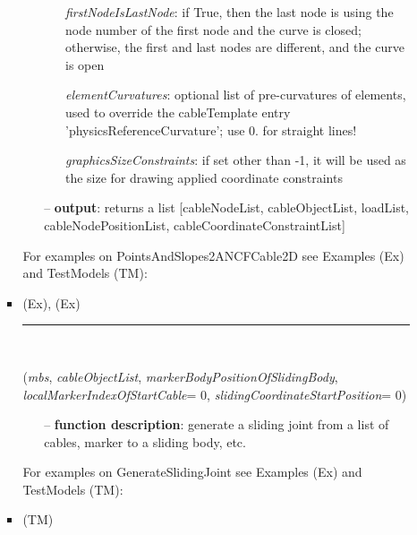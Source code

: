 \begin{itemize}[leftmargin=1.4cm]
\begin{itemize}[leftmargin=0.5cm]
\begin{itemize}[leftmargin=1.4cm]
\begin{itemize}[leftmargin=0.7cm]
\begin{itemize}[leftmargin=1.2cm]
    \item[] {\it   firstNodeIsLastNode}: if True, then the last node is using the node number of the first node and the curve is closed; otherwise, the first and last nodes are different, and the curve is open
    \item[] {\it   elementCurvatures}: optional list of pre-curvatures of elements, used to override the cableTemplate entry 'physicsReferenceCurvature'; use 0. for straight lines!
    \item[] {\it   graphicsSizeConstraints}: if set other than -1, it will be used as the size for drawing applied coordinate constraints
  \end{itemize}
  \item[--]  {\bf output}: returns a list [cableNodeList, cableObjectList, loadList, cableNodePositionList, cableCoordinateConstraintList]\vspace{12pt}\end{itemize}
%
%
\noindent For examples on PointsAndSlopes2ANCFCable2D see Examples (Ex) and TestModels (TM):
\bi
 \item \footnotesize {} (Ex), 
 (Ex)\ei

%
\noindent\rule{8cm}{0.75pt}\vspace{1pt} \\ 
\begin{flushleft}
\label{sec:beams:GenerateSlidingJoint}
({\it mbs}, {\it cableObjectList}, {\it markerBodyPositionOfSlidingBody}, {\it localMarkerIndexOfStartCable}= 0, {\it slidingCoordinateStartPosition}= 0)
\end{flushleft}
\setlength{\itemindent}{0.7cm}
\begin{itemize}[leftmargin=0.7cm]
  \item[--]  {\bf function description}: generate a sliding joint from a list of cables, marker to a sliding body, etc.\vspace{12pt}\end{itemize}
%
%
\noindent For examples on GenerateSlidingJoint see Examples (Ex) and TestModels (TM):
\bi
 \item \footnotesize {} (TM)\ei


\end{itemize}
\end{itemize}
\end{itemize}
